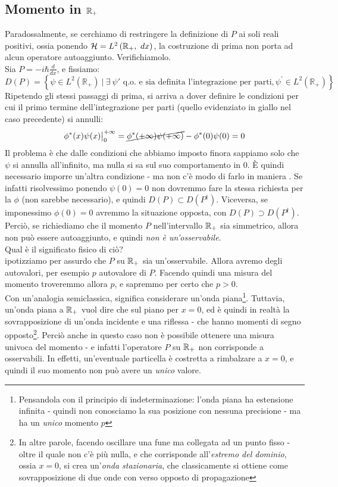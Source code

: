 \documentclass[../../FisicaTeorica.tex]{subfiles}
\begin{document}
\subsection{Momento in $\mathbb{R}_+$}
Paradossalmente, se cerchiamo di restringere la definizione di $P$ ai soli reali positivi, ossia ponendo $\mathcal{H}=L^2\left(\mathbb{R}_+,\ dx\right)$, la costruzione di prima non porta ad alcun operatore autoaggiunto. Verifichiamolo.\\
Sia $P= -i\hbar \frac{d}{dx}$, e fissiamo:
\[
D\left(P\right)= \left\{\psi\in L^2\left(\mathbb{R}_+\right)\ |\ \exists\> \psi'
\text{ q.o. e sia definita l'integrazione per parti}, \psi^\prime\in L^2(\mathbb{R}_+)\right\}
\]
Ripetendo gli stessi passaggi di prima, si arriva a dover definire le condizioni per cui il primo termine dell'integrazione per parti (quello evidenziato in giallo nel caso precedente) si annulli:
\[
\phi^*(x)\psi(x)\big|_{0}^{+\infty} = \cancel{\phi^*(+\infty)\psi(+\infty)} - \phi^*(0)\psi(0) = 0
\]
Il problema è che dalle condizioni che abbiamo imposto finora sappiamo solo che $\psi$ si annulla all'infinito, ma nulla si sa sul suo comportamento in $0$. È quindi necessario imporre un'altra condizione - ma non c'è modo di farlo in maniera . Se infatti risolvessimo ponendo $\psi(0) = 0$ non dovremmo fare la stessa richiesta per la $\phi$ (non sarebbe necessario), e quindi $D(P) \subset D(P^\dag)$. Viceversa, se imponessimo $\phi(0) = 0$ avremmo la situazione opposta, con $D(P) \supset D(P^\dag)$.\\
Perciò, se richiediamo che il momento $P$ nell'intervallo $\mathbb{R}_+$ sia simmetrico, allora non può essere autoaggiunto, e quindi \textit{non è un'osservabile}.\\
Qual è il significato fisico di ciò?\\
ipotizziamo per assurdo che $P$ su $\mathbb{R}_+$ sia un'osservabile. Allora avremo degli autovalori, per esempio $p$ autovalore di $P$. Facendo quindi una misura del momento troveremmo allora $p$, e sapremmo per certo che $p>0$.\\
Con un'analogia semiclassica,  significa considerare un'onda piana\footnote{Pensandola con il principio di indeterminazione: l'onda piana ha estensione infinita - quindi non conosciamo la sua posizione con nessuna precisione - ma ha un \textit{unico} momento $p$}. Tuttavia, un'onda piana  a $\mathbb{R}_+$ vuol dire che  sul piano per $x=0$, ed è quindi in realtà la sovrapposizione di un'onda incidente e una riflessa - che hanno momenti di segno opposto\footnote{In altre parole, facendo oscillare una fune  ma collegata ad un punto fisso - oltre il quale non c'è più nulla, e che corrisponde all'\textit{estremo del dominio}, ossia $x=0$, si crea un'\textit{onda stazionaria}, che classicamente si ottiene come sovrapposizione di due onde con verso opposto di propagazione}. Perciò anche in questo caso non è possibile ottenere una misura univoca del momento - e infatti l'operatore $P$ su $\mathbb{R}_+$ non corrisponde a osservabili. In effetti, un'eventuale particella è costretta a rimbalzare a $x=0$, e quindi il suo momento non può avere un \textit{unico} valore.
\end{document}
